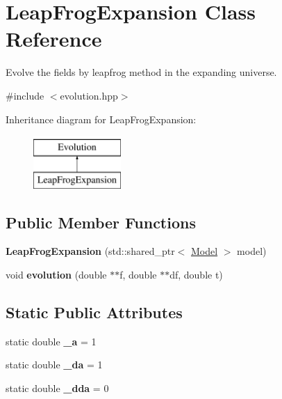 \hypertarget{class_leap_frog_expansion}{}\section{Leap\+Frog\+Expansion Class Reference}
\label{class_leap_frog_expansion}


Evolve the fields by leapfrog method in the expanding universe.  




{\ttfamily \#include $<$evolution.\+hpp$>$}

Inheritance diagram for Leap\+Frog\+Expansion\+:\begin{figure}[H]
\begin{center}
\leavevmode
\includegraphics[height=2.000000cm]{class_leap_frog_expansion}
\end{center}
\end{figure}
\subsection*{Public Member Functions}
\begin{DoxyCompactItemize}
\item 
\mbox{\label{class_leap_frog_expansion_a8df00d93429f710e92165aea20e508de}} 
{\bfseries Leap\+Frog\+Expansion} (std\+::shared\+\_\+ptr$<$ \mbox{\hyperlink{class_model}{Model}} $>$ model)
\item 
\mbox{\label{class_leap_frog_expansion_a27854e0461bb73d00876439cf734aff6}} 
void {\bfseries evolution} (double $\ast$$\ast$f, double $\ast$$\ast$df, double t)
\end{DoxyCompactItemize}
\subsection*{Static Public Attributes}
\begin{DoxyCompactItemize}
\item 
\mbox{\label{class_leap_frog_expansion_aa2a0a61cc01b33b257d553b40c32d10e}} 
static double {\bfseries \+\_\+a} = 1
\item 
\mbox{\label{class_leap_frog_expansion_ae3b8aaa75482f796026edce748ba7d46}} 
static double {\bfseries \+\_\+da} = 1
\item 
\mbox{\label{class_leap_frog_expansion_a49e7b433e3af0db474bf4113e1ae5510}} 
static double {\bfseries \+\_\+dda} = 0
\end{DoxyCompactItemize}
